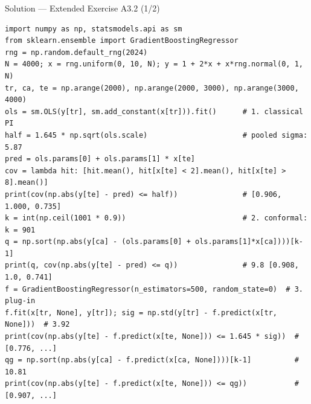 \documentclass[aspectratio=169,11pt]{beamer}
\begin{document}
\begin{frame}[fragile]{Solution --- Extended Exercise A3.2 (1/2)}
\begin{solutionbox}
\begin{lstlisting}[basicstyle=\ttfamily\scriptsize]
import numpy as np, statsmodels.api as sm
from sklearn.ensemble import GradientBoostingRegressor
rng = np.random.default_rng(2024)
N = 4000; x = rng.uniform(0, 10, N); y = 1 + 2*x + x*rng.normal(0, 1, N)
tr, ca, te = np.arange(2000), np.arange(2000, 3000), np.arange(3000, 4000)
ols = sm.OLS(y[tr], sm.add_constant(x[tr])).fit()      # 1. classical PI
half = 1.645 * np.sqrt(ols.scale)                      # pooled sigma: 5.87
pred = ols.params[0] + ols.params[1] * x[te]
cov = lambda hit: [hit.mean(), hit[x[te] < 2].mean(), hit[x[te] > 8].mean()]
print(cov(np.abs(y[te] - pred) <= half))               # [0.906, 1.000, 0.735]
k = int(np.ceil(1001 * 0.9))                           # 2. conformal: k = 901
q = np.sort(np.abs(y[ca] - (ols.params[0] + ols.params[1]*x[ca])))[k-1]
print(q, cov(np.abs(y[te] - pred) <= q))               # 9.8 [0.908, 1.0, 0.741]
f = GradientBoostingRegressor(n_estimators=500, random_state=0)  # 3. plug-in
f.fit(x[tr, None], y[tr]); sig = np.std(y[tr] - f.predict(x[tr, None]))  # 3.92
print(cov(np.abs(y[te] - f.predict(x[te, None])) <= 1.645 * sig))  # [0.776, ...]
qg = np.sort(np.abs(y[ca] - f.predict(x[ca, None])))[k-1]          # 10.81
print(cov(np.abs(y[te] - f.predict(x[te, None])) <= qg))           # [0.907, ...]
\end{lstlisting}
\end{solutionbox}
\end{frame}
\end{document}

